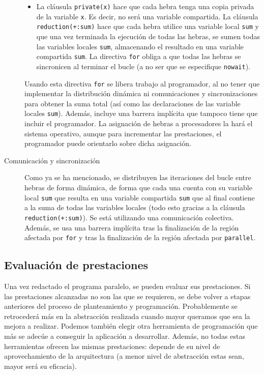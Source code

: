 \begin{description}
\begin{itemize}
            \item La cláusula \verb|private(x)| hace que cada hebra tenga una copia privada de la variable \verb|x|. Es decir, no será una variable compartida. La cláusula \verb|reduction(+:sum)| hace que cada hebra utilice una variable local \verb|sum| y que una vez terminada la ejecución de todas las hebras, se sumen todas las variables locales \verb|sum|, almacenando el resultado en una variable compartida \verb|sum|. La directiva \verb|for| obliga a que todas las hebras se sincronicen al terminar el bucle (a no ser que se especifique \verb|nowait|).
        \end{itemize}
        Usando esta directiva \verb|for| se libera trabajo al programador, al no tener que implementar la distribución dinámica ni comunicaciones y sincronizaciones para obtener la suma total (así como las declaraciones de las variable locales \verb|sum|). Además, incluye una barrera implícita que tampoco tiene que incluir el programador. La asignación de hebras a procesadores la hará el sistema operativo, aunque para incrementar las prestaciones, el programador puede orientarlo sobre dicha asignación.
    \item [Comunicación y sincronización] 
        Como ya se ha mencionado, se distribuyen las iteraciones del bucle entre hebras de forma dinámica, de forma que cada una cuenta con su variable local \verb|sum| que resulta en una variable compartida \verb|sum| que al final contiene a la suma de todas las variables locales (todo esto gracias a la cláusula \verb|reduction(+:sum)|). Se está utilizando una comunicación colectiva. Además, se usa una barrera implícita tras la finalización de la región afectada por \verb|for| y tras la finalización de la región afectada por \verb|parallel|.
\end{description}

\subsection{Evaluación de prestaciones}
Una vez redactado el programa paralelo, se pueden evaluar sus prestaciones. Si las prestaciones alcanzadas no son las que se requieren, se debe volver a etapas anteriores del proceso de planteamiento y programación. Probablemente se retrocederá más en la abstracción realizada cuando mayor queramos que sea la mejora a realizar. Podemos también elegir otra herramienta de programación que más se adecúe a conseguir la aplicación a desarrollar. Además, no todas estas herramientas ofrecen las mismas prestaciones: depende de su nivel de aprovechamiento de la arquitectura (a menor nivel de abstracción estas sean, mayor será su eficacia).

